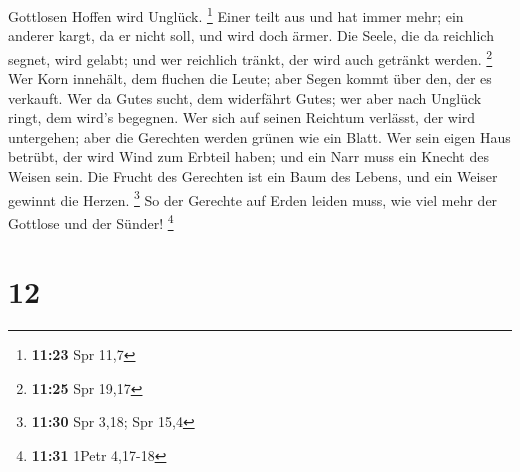 Gottlosen Hoffen wird Unglück. \footnote{\textbf{11:23} Spr 11,7}
 Einer teilt aus und hat immer mehr; ein anderer kargt,
da er nicht soll, und wird doch ärmer.  Die Seele, die da
reichlich segnet, wird gelabt; und wer reichlich tränkt, der wird auch
getränkt werden. \footnote{\textbf{11:25} Spr 19,17}  Wer
Korn innehält, dem fluchen die Leute; aber Segen kommt über den, der es
verkauft.  Wer da Gutes sucht, dem widerfährt Gutes; wer
aber nach Unglück ringt, dem wird's begegnen.  Wer sich
auf seinen Reichtum verlässt, der wird untergehen; aber die Gerechten
werden grünen wie ein Blatt.  Wer sein eigen Haus
betrübt, der wird Wind zum Erbteil haben; und ein Narr muss ein Knecht
des Weisen sein.  Die Frucht des Gerechten ist ein Baum
des Lebens, und ein Weiser gewinnt die Herzen. \footnote{\textbf{11:30}
  Spr 3,18; Spr 15,4}  So der Gerechte auf Erden leiden
muss, wie viel mehr der Gottlose und der Sünder! \footnote{\textbf{11:31}
  1Petr 4,17-18}

\hypertarget{section-11}{%
\section{12}\label{section-11}}

